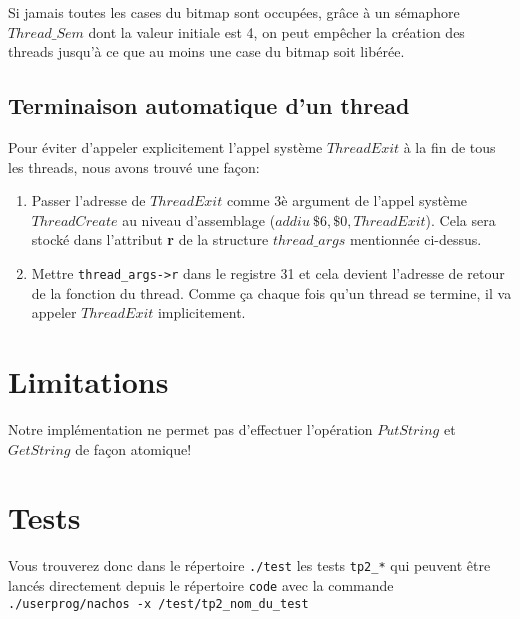 \documentclass[12pt,a4paper]{article}
\begin{document}
Si jamais toutes les cases du bitmap sont occupées, grâce à un sémaphore $Thread\_Sem$ dont la valeur initiale est 4, on peut empêcher la création des threads jusqu'à ce que au moins une case du bitmap soit libérée.

\subsection{Terminaison automatique d'un thread}
Pour éviter d'appeler explicitement l'appel système $ThreadExit$ à la fin de tous les threads, nous avons trouvé une façon:
\begin{enumerate}
\item Passer l'adresse de $ThreadExit$ comme 3è argument de l'appel système $ThreadCreate$ au niveau d'assemblage ($addiu\ \$6,\$0,ThreadExit$). Cela sera stocké dans l'attribut \textbf{r} de la structure $thread\_args$ mentionnée ci-dessus.
\item Mettre \verb$thread_args->r$ dans le registre 31 et cela devient l'adresse de retour de la fonction du thread. Comme ça chaque fois qu'un thread se termine, il va appeler $ThreadExit$ implicitement.
\end{enumerate}


\section{Limitations}
Notre implémentation ne permet pas d'effectuer l'opération $PutString$ et $GetString$ de façon atomique! 

\section{Tests}
Vous trouverez donc dans le répertoire \verb$./test$ les tests \verb$tp2_*$ qui peuvent être lancés directement depuis le répertoire \verb$code$ avec la commande \texttt{./userprog/nachos -x /test/tp2\_nom\_du\_test}
\end{document}
